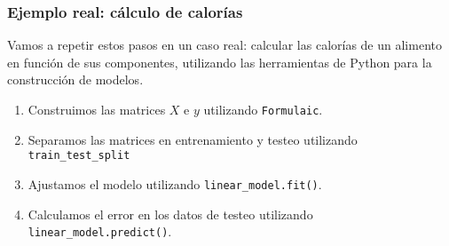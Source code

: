 \documentclass[aspectratio=169,12pt]{beamer}
\begin{document}
\begin{frame}
\frametitle{Ejemplo real: cálculo de calorías}

Vamos a repetir estos pasos en un caso real: calcular las calorías de un alimento en función de sus componentes, utilizando las herramientas de Python para la construcción de modelos.
\begin{enumerate}
\item Construimos las matrices $X$ e $y$ utilizando \lstinline{Formulaic}.
\item Separamos las matrices en entrenamiento y testeo utilizando \lstinline{train_test_split}
\item Ajustamos el modelo utilizando \lstinline{linear_model.fit()}.
\item Calculamos el error en los datos de testeo utilizando \lstinline{linear_model.predict()}.
\end{enumerate}

\end{frame}
\end{document}
